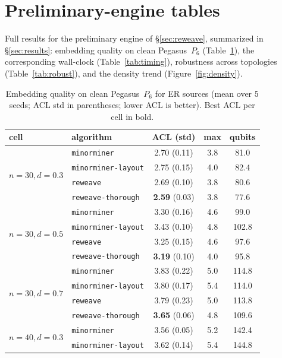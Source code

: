 \documentclass[acmsmall,anonymous,nonacm]{acmart}
\begin{document}
\appendix
\section{Preliminary-engine tables}
\label{app:prelim}

Full results for the preliminary engine of \S\ref{sec:reweave}, summarized in
\S\ref{sec:results}: embedding quality on clean Pegasus~$P_6$
(Table~\ref{tab:quality}), the corresponding wall-clock (Table~\ref{tab:timing}),
robustness across topologies (Table~\ref{tab:robust}), and the density trend
(Figure~\ref{fig:density}).

\begin{table}[t]
\caption{Embedding quality on clean Pegasus~$P_6$ for ER sources (mean over $5$
seeds; ACL std in parentheses; lower ACL is better). Best ACL per cell in bold.}
\label{tab:quality}
\small
\begin{tabular}{llccc}
\toprule
cell & algorithm & ACL (std) & max & qubits \\
\midrule
\multirow{4}{*}{$n{=}30,d{=}0.3$}
 & \texttt{minorminer}          & 2.70 (0.11) & 3.8 & 81.0 \\
 & \texttt{minorminer-layout}   & 2.75 (0.15) & 4.0 & 82.4 \\
 & \texttt{reweave}          & 2.69 (0.10) & 3.8 & 80.6 \\
 & \texttt{reweave-thorough} & \textbf{2.59} (0.03) & 3.8 & 77.6 \\
\midrule
\multirow{4}{*}{$n{=}30,d{=}0.5$}
 & \texttt{minorminer}          & 3.30 (0.16) & 4.6 & 99.0 \\
 & \texttt{minorminer-layout}   & 3.43 (0.10) & 4.8 & 102.8 \\
 & \texttt{reweave}          & 3.25 (0.15) & 4.6 & 97.6 \\
 & \texttt{reweave-thorough} & \textbf{3.19} (0.10) & 4.0 & 95.8 \\
\midrule
\multirow{4}{*}{$n{=}30,d{=}0.7$}
 & \texttt{minorminer}          & 3.83 (0.22) & 5.0 & 114.8 \\
 & \texttt{minorminer-layout}   & 3.80 (0.17) & 5.4 & 114.0 \\
 & \texttt{reweave}          & 3.79 (0.23) & 5.0 & 113.8 \\
 & \texttt{reweave-thorough} & \textbf{3.65} (0.06) & 4.8 & 109.6 \\
\midrule
\multirow{4}{*}{$n{=}40,d{=}0.3$}
 & \texttt{minorminer}          & 3.56 (0.05) & 5.2 & 142.4 \\
 & \texttt{minorminer-layout}   & 3.62 (0.14) & 5.4 & 144.8 \\

\end{tabular}
\end{table}
\end{document}
